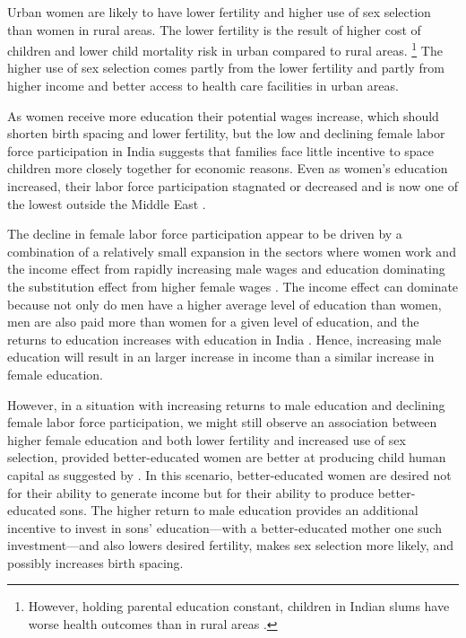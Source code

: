 Urban women are likely to have lower fertility and higher use of sex selection than women 
in rural areas.
The lower fertility is the result of higher cost of children and lower child mortality 
risk in urban compared to rural areas.%
\footnote{
However, holding parental education constant, children in Indian slums have worse
health outcomes than in rural areas \citep{Portner2018a}.
}
The higher use of sex selection comes partly from the lower fertility and partly from
higher income and better access to health care facilities in urban areas.

As women receive more education their potential wages increase, which should shorten 
birth spacing and lower fertility, but the low and declining female labor force 
participation in India suggests that families face little incentive to space children 
more closely together for economic reasons.
Even as women's education increased, their labor force participation stagnated or 
decreased and is now one of the lowest outside the Middle East 
\citep{Klasen2015,Fletcher2017,Afridi2018,Bhargava2018,Chatterjee2018}.

The decline in female labor force participation appear to be driven by a combination
of a relatively small expansion in the sectors where women work and the income effect 
from rapidly increasing male wages and education dominating the substitution effect from 
higher female wages \citep{Klasen2015,Bhargava2018}.
The income effect can dominate because not only do men have a higher average level of 
education than women, men are also paid more than women for a given level of education, 
and the returns to education increases with education in India \citep{Agrawal2011}.
Hence, increasing male education will result in an larger increase in income than a 
similar increase in female education.

However, in a situation with increasing returns to male education and declining female labor 
force participation, we might still observe an association between higher female education 
and both lower fertility and increased use of sex selection, provided better-educated women 
are better at producing child human capital as suggested by \citet{Behrman1999}.
In this scenario, better-educated women are desired not for their ability to generate
income but for their ability to produce better-educated sons.
The higher return to male education provides an additional incentive to invest in sons'
education---with a better-educated mother one such investment---and also lowers desired 
fertility, makes sex selection more likely, and possibly increases birth spacing.

